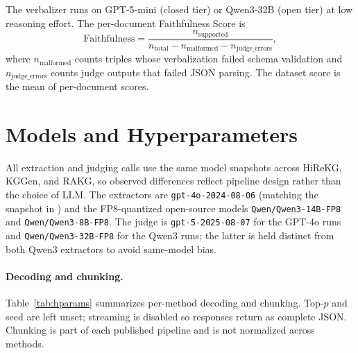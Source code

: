 \documentclass[11pt]{article}
\begin{document}
\noindent The verbalizer runs on GPT-5-mini (closed tier) or Qwen3-32B (open tier) at low reasoning effort. The per-document Faithfulness Score is
\[
\text{Faithfulness} = \frac{n_{\text{supported}}}{n_{\text{total}} - n_{\text{malformed}} - n_{\text{judge\_errors}}},
\]
where $n_{\text{malformed}}$ counts triples whose verbalization failed schema validation and $n_{\text{judge\_errors}}$ counts judge outputs that failed JSON parsing. The dataset score is the mean of per-document scores.



\section{Models and Hyperparameters}
\label{app:hardware}

All extraction and judging calls use the same model snapshots across HiReKG, KGGen, and RAKG, so observed differences reflect pipeline design rather than the choice of LLM. The extractors are \texttt{gpt-4o-2024-08-06} (matching the snapshot in \citealp{kggen}) and the FP8-quantized open-source models \texttt{Qwen/Qwen3-14B-FP8} and \texttt{Qwen/Qwen3-8B-FP8}. The judge is \texttt{gpt-5-2025-08-07} for the GPT-4o runs and \texttt{Qwen/Qwen3-32B-FP8} for the Qwen3 runs; the latter is held distinct from both Qwen3 extractors to avoid same-model bias.

\paragraph{Decoding and chunking.} Table~\ref{tab:hparams} summarizes per-method decoding and chunking. Top-$p$ and seed are left unset; streaming is disabled so responses return as complete JSON. Chunking is part of each published pipeline and is not normalized across methods.
\end{document}
